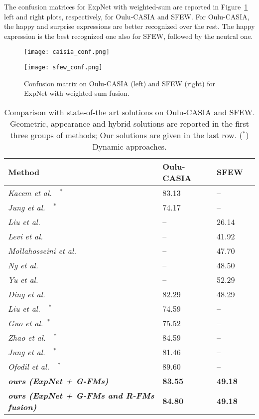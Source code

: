 \documentclass{bmvc2k}
\begin{document}
The confusion matrices for ExpNet with weighted-sum are reported in Figure~\ref{fig:sfew_conf} left and right plots, respectively, for Oulu-CASIA and SFEW. For Oulu-CASIA, the happy and surprise expressions are better recognized over the rest. The happy expression is the best recognized one also for SFEW, followed by the neutral one. 

\begin{figure}[!ht]
\centering
\begin{minipage}{0.4\linewidth}
\centering
\texttt{[image: caisia\_conf.png]}
\end{minipage}
\begin{minipage}{0.4\linewidth}
\centering
\texttt{[image: sfew\_conf.png]}
\end{minipage}
\caption{Confusion matrix on Oulu-CASIA (left) and SFEW (right) for ExpNet with weighted-sum fusion.}
\label{fig:sfew_conf}
\end{figure}
\setlength{\tabcolsep}{4pt}
\begin{table}[!ht]
\begin{center}
\small
\begin{tabular}{llll}
\hline
\textbf{Method} & \textbf{Oulu-CASIA} & \textbf{SFEW} \\
\hline
\it Kacem et al.~\cite{kacem:2017}~$^*$ & 83.13 & --  \\
\it Jung et al.~\cite{jung2015joint}~$^*$ & 74.17 & -- \\
\hline
\it Liu et al.~\cite{liu2013aware} & -- & 26.14 \\
\it Levi et al.~\cite{levi2015emotion}& -- & 41.92 \\
\it Mollahosseini et al.~\cite{mollahosseini2016going} & -- & 47.70 \\
\it Ng et al.~\cite{ng2015deep} & -- & 48.50\\
\it Yu et al.~\cite{yu2015image} & --& 52.29\\
\it Ding et al.~\cite{ding2017facenet2expnet} & 82.29 & 48.29 \\
\it  Liu et al.~\cite{liu2014learning}~$^*$ & 74.59 & -- \\
\it Guo et al.\cite{guo2012dynamic}~$^*$ & 75.52 & -- \\
\it Zhao et al.~\cite{zhao2016peak}~$^*$  & 84.59 & -- \\
\hline
\it Jung et al.~\cite{jung2015joint}~$^*$ & 81.46 & -- \\
\it Ofodil et al.~\cite{ofodile2017automatic}~$^*$ & 89.60 & -- \\

\hline
\it \textbf{ours (ExpNet + G-FMs)} & \textbf{83.55} & \textbf{49.18} \\
\it \textbf{ours (ExpNet + G-FMs and R-FMs fusion)} & \textbf{84.80} &
\textbf{49.18} \\
\hline
\end{tabular}
\end{center}
\caption{Comparison with state-of-the art solutions on Oulu-CASIA and SFEW. Geometric, appearance and hybrid solutions are reported in the first three groups of methods; Our solutions are given in the last row. ($^*$) Dynamic approaches.}
\label{tab:ResultsComparisons}
\end{table}
\end{document}
